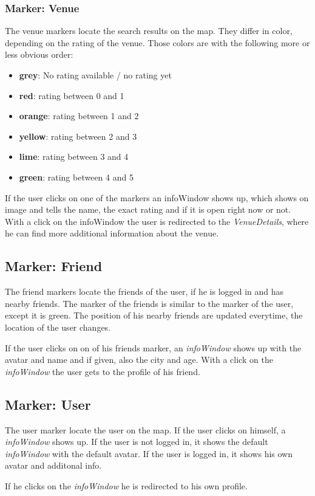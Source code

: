 \subsubsection{Marker: Venue}
The venue markers locate the search results on the map. They differ in color, depending on the rating of the venue. Those colors are with the following more or less obvious order:

\begin{itemize}
\item \textbf{grey}: No rating available / no rating yet
\item \textbf{red}: rating between 0 and 1
\item \textbf{orange}: rating between 1 and 2
\item \textbf{yellow}: rating between 2 and 3
\item \textbf{lime}: rating between 3 and 4
\item \textbf{green}: rating between 4 and 5
\end{itemize}

If the user clicks on one of the markers an infoWindow shows up, which shows on image and tells the name, the exact rating and if it is open right now or not. With a click on the infoWindow the user is redirected to the \textit{VenueDetails}, where he can find more additional information about the venue.

\subsection{Marker: Friend}
The friend markers locate the friends of the user, if he is logged in and has nearby friends. The marker of the friends is similar to the marker of the user, except it is green.
The position of his nearby friends are updated everytime, the location of the user changes. 

If the user clicks on on of his friends marker, an \textit{infoWindow} shows up with the avatar and name and if given, also the city and age. With a click on the \textit{infoWindow} the user gets to the profile of his friend.

\subsection{Marker: User}
The user marker locate the user on the map. If the user clicks on himself, a \textit{infoWindow} shows up. If the user is not logged in, it shows the default \textit{infoWindow} with the default avatar. If the user is logged in, it shows his own avatar and additonal info. 

If he clicks on the \textit{infoWindow} he is redirected to his own profile.

 



